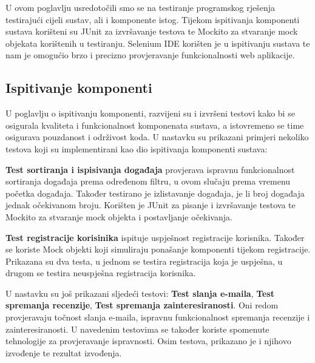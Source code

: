 			U ovom poglavlju usredotočili smo se na testiranje programskog rješenja testirajući cijeli sustav, ali i komponente istog. Tijekom ispitivanja komponenti sustava korišteni su JUnit za izvršavanje testova te Mockito za stvaranje mock objekata korištenih u testiranju. Selenium IDE korišten je u ispitivanju sustava te nam je omogućio brzo i precizno provjeravanje funkcionalnosti web aplikacije.
			
			\subsection{Ispitivanje komponenti}
			
			U poglavlju o ispitivanju komponenti, razvijeni su i izvršeni testovi kako bi se osigurala kvaliteta i funkcionalnost komponenata sustava, a istovremeno se time osigurava pouzdanost i održivost koda. U nastavku su prikazani primjeri nekoliko testova koji su implementirani kao dio ispitivanja komponenti sustava:

			\textbf{Test sortiranja i ispisivanja događaja} provjerava ispravnu funkcionalnost sortiranja događaja prema određenom filtru, u ovom slučaju prema vremenu početka događaja. Također testirano je izlistavanje događaja, je li broj događaja jednak očekivanom broju. Korišten je JUnit za pisanje i izvršavanje testova te Mockito za stvaranje mock objekta i postavljanje očekivanja.


			\textbf{Test registracije korisinika} ispituje uspješnost registracije korisnika. Također se koriste Mock objekti koji simuliraju ponašanje komponenti tijekom registracije. Prikazana su dva testa, u jednom se testira registracija koja je uspješna, u drugom se testira neuspješna registracija korisnika.

			U nastavku su još prikazani sljedeći testovi: \textbf{Test slanja e-maila}, \textbf{Test spremanja recenzije}, \textbf{Test spremanja zainteresiranosti}. Oni redom provjeravaju točnost slanja e-maila, ispravnu funkcionalnost spremanja recenzije i zainteresiranosti. U navedenim testovima se također koriste spomenute tehnologije za provjeravanje ispravnosti. Osim testova, prikazano je i njihovo izvođenje te rezultat izvođenja.
			
